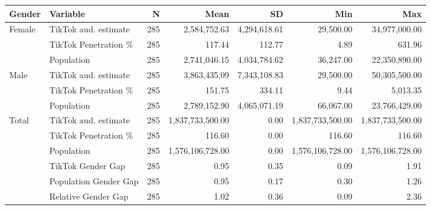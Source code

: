 \begin{tabular}{l l r r r r r}
\toprule
Gender & Variable & N & Mean & SD & Min & Max \\
\midrule
Female & TikTok aud. estimate & 285 & 2,584,752.63 & 4,294,618.61 & 29,500.00 & 34,977,000.00 \\
 & TikTok Penetration \% & 285 & 117.44 & 112.77 & 4.89 & 631.96 \\
 & Population & 285 & 2,741,046.15 & 4,034,784.62 & 36,247.00 & 22,350,890.00 \\
Male & TikTok  aud. estimate & 285 & 3,863,435.09 & 7,343,108.83 & 29,500.00 & 50,305,500.00 \\
 & TikTok Penetration \% & 285 & 151.75 & 334.11 & 9.44 & 5,013.35 \\
 & Population & 285 & 2,789,152.90 & 4,065,071.19 & 66,067.00 & 23,766,429.00 \\
Total & TikTok  aud. estimate & 285 & 1,837,733,500.00 & 0.00 & 1,837,733,500.00 & 1,837,733,500.00 \\
 & TikTok Penetration \% & 285 & 116.60 & 0.00 & 116.60 & 116.60 \\
 & Population & 285 & 1,576,106,728.00 & 0.00 & 1,576,106,728.00 & 1,576,106,728.00 \\
 & TikTok Gender Gap & 285 & 0.95 & 0.35 & 0.09 & 1.91 \\
 & Population Gender Gap & 285 & 0.95 & 0.17 & 0.30 & 1.26 \\
 & Relative Gender Gap & 285 & 1.02 & 0.36 & 0.09 & 2.36 \\
\bottomrule
\end{tabular}
